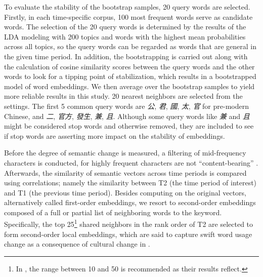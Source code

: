 To evaluate the stability of the bootstrap samples, 20 query words are selected. Firstly, in each time-specific corpus, 100 most frequent words serve as candidate words. The selection of the 20 query words is determined by the results of the LDA modeling with 200 topics and words with the highest mean probabilities across all topics, so the query words can be regarded as words that are general in the given time period. In addition, the bootstrapping is carried out along with the calculation of cosine similarity scores between the query words and the other words to look for a tipping point of stabilization, which results in a bootstrapped model of word embeddings. We then average over the bootstrap samples to yield more reliable results in this study. 20 nearest neighbors are selected from the  settings. The first 5 common query words are \textit{公}, \textit{君}, \textit{國}, \textit{太}, \textit{官} for pre-modern Chinese, and \textit{二}, \textit{官方}, \textit{發生}, \textit{兼}, \textit{且}. Although some query words like \textit{兼} and \textit{且} might be considered stop words and otherwise removed, they are included to see if stop words are asserting more impact on the stability of  embeddings.


Before the degree of semantic change is measured, a filtering of mid-frequency characters is conducted, for highly frequent characters are not ``content-bearing'' \parencite{hamilton2016cultural,rodda2017panta}. Afterwards, the similarity of semantic vectors across time periods is compared using correlations; namely the similarity between T2 (the time period of interest) and T1 (the previous time period). Besides computing on the original vectors, alternatively called first-order embeddings, we resort to second-order embeddings composed of a full or partial list of neighboring words to the keyword. Specifically, the top 25\footnote{In \textcite{hamilton2016cultural}, the range between 10 and 50 is recommended as their results reflect.} shared neighbors in the rank order of T2 are selected to form second-order local embeddings, which are said to capture swift word usage change as a consequence of cultural change in \textcite{hamilton2016cultural}.

